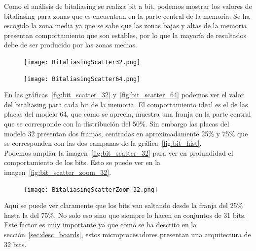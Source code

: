 \documentclass[spanish]{template/minim}
\begin{document}
Como el análisis de bitaliasing se realiza bit a bit, podemos mostrar los valores de bitaliasing para zonas que es encuentran en la parte central de la memoria. Se ha escogido la zona media ya que se sabe que las zonas bajas y altas de la memoria presentan comportamiento que son estables, por lo que la mayoría de resultados debe de ser producido por las zonas medias.\\

\begin{figure}[H]
    \centering
    \texttt{[image: BitaliasingScatter32.png]}
\end{figure}

\begin{figure}[H]
    \centering
    \texttt{[image: BitaliasingScatter64.png]}
\end{figure}

En las gráficas~\ref{fig:bit_scatter_32} y~\ref{fig:bit_scatter_64} podemos ver el valor del bitaliasing para cada bit de la memoria. El comportamiento ideal es el de las placas del modelo 64, que como se aprecia, muestra una franja en la parte central que se corresponde con la distribución del 50\%. Sin embargo las placas del modelo 32 presentan dos franjas, centradas en aproximadamente 25\% y 75\% que se corresponden con las dos campanas de la gráfica~\ref{fig:bit_hist}.\\

Podemos ampliar la imagen~\ref{fig:bit_scatter_32} para ver en profundidad el comportamiento de los bits. Esto se puede ver en la imagen~\ref{fig:bit_scatter_zoom_32}.\\

\begin{figure}[H]
    \centering
    \texttt{[image: BitaliasingScatterZoom\_32.png]}
\end{figure}

Aquí se puede ver claramente que los bits van saltando desde la franja del 25\% hasta la del 75\%. No solo eso sino que siempre lo hacen en conjuntos de 31 bits. Este factor es muy importante ya que como se ha descrito en la sección~\ref{sec:desc_boards}, estos microprocesadores presentan una arquitectura de 32 bits.\\
\end{document}

